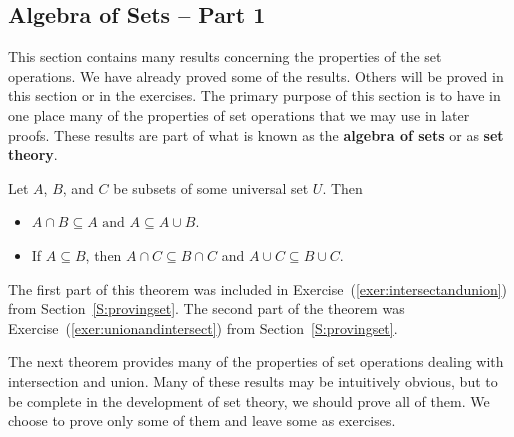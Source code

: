 \subsection*{Algebra of Sets -- Part 1}
This section contains many results concerning the properties of the set operations.  We have already proved some of the results.  Others will be proved in this section or in the exercises.  The primary purpose of this section is to have in one place many of the properties of set operations that we may use in later proofs.  These results are part of what is known as the \textbf{algebra of sets}
%
 or as \textbf{set theory}.

\begin{theorem} \label{T:intersectandunion}
Let  $A$, $B$, and  $C$  be subsets of some universal set  $U$.  Then
\begin{itemize}  
\item $A \cap B \subseteq A\text{  and  }A \subseteq A \cup B$.
\item If  $A \subseteq B$, then  $A \cap C \subseteq B \cap C$  and  $A \cup C \subseteq B \cup C$.
\end{itemize}
\end{theorem}

\begin{myproof}
The first part of this theorem was included in Exercise~(\ref{exer:intersectandunion}) from Section~\ref{S:provingset}.  The second part of the theorem was Exercise~(\ref{exer:unionandintersect}) from Section~\ref{S:provingset}.
\end{myproof}

The next theorem provides many of the properties of set operations dealing with intersection and union.  Many of these results may be intuitively obvious, but to be complete in the development of set theory, we should prove all of them.  We choose to prove only some of them and leave some as exercises.


